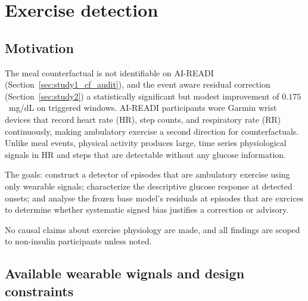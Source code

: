 \section{ Exercise detection }
\label{sec:exercise_detection}

\subsection{Motivation}
\label{subsec:ex_motivation}

The meal counterfactual is not identifiable on AI-READI
(Section~\ref{sec:study1_cf_audit}), and the event aware residual correction
(Section~\ref{sec:study2}) a statistically significant but modest
improvement of $0.175$~mg/dL on triggered windows.
AI-READI participants wore Garmin wrist devices that record heart rate (HR),
step counts, and respiratory rate (RR) continuously, making ambulatory
exercise a second direction for counterfactuals.
Unlike meal events, physical activity produces large, time series physiological
signals in HR and steps that are detectable without any glucose information.

The goals: construct a detector of episodes that are 
ambulatory exercise using only wearable signals; characterize
the descriptive glucose response at detected onsets; and analyse the frozen
base model's residuals at episodes that are exrcices to determine whether systematic
signed bias justifies a correction or advisory.

No causal claims about exercise physiology are made, and all findings are
scoped to non-insulin participants unless noted.

\subsection{Available wearable wignals and design constraints}
\label{subsec:ex_signals}

